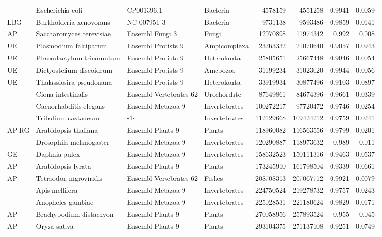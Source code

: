 \begin{table}[htbp]
{\begin{tabular}{ l l l l r r r r }
   & Escherichia coli & CP001396.1 & Bacteria & 4578159 & 4551258 & 0.9941 & 0.0059 \\
  LBG & Burkholderia xenovorans & NC 007951-3 & Bacteria & 9731138 & 9593486 & 0.9859 & 0.0141 \\
  AP & Saccharomyces cerevisiae & Ensembl Fungi 3 & Fungi & 12070898 & 11974342 & 0.992 & 0.008 \\
  UE & Plasmodium falciparum & Ensembl Protists 9 & Ampicomplexa & 23263332 & 21070640 & 0.9057 & 0.0943 \\
  UE & Phaeodactylum tricornutum & Ensembl Protists 9 & Heterokonta & 25805651 & 25667448 & 0.9946 & 0.0054 \\
  UE & Dictyostelium discoideum & Ensembl Protists 9 & Amebozoa & 31199234 & 31023020 & 0.9944 & 0.0056 \\
  UE & Thalassiosira pseudonana & Ensembl Protists 9 & Heterokonta & 33919934 & 30877496 & 0.9103 & 0.0897 \\
   & Ciona intestinalis & Ensembl Vertebrates 62 & Urochordate & 87649861 & 84674396 & 0.9661 & 0.0339 \\
   & Caenorhabditis elegans & Ensembl Metazoa 9 & Invertebrates & 100272217 & 97720472 & 0.9746 & 0.0254 \\
   & Tribolium castaneum & -1- & Invertebrates & 112129668 & 109424212 & 0.9759 & 0.0241 \\
  AP RG & Arabidopsis thaliana & Ensembl Plants 9 & Plants & 118960082 & 116563556 & 0.9799 & 0.0201 \\
   & Drosophila melanogaster & Ensembl Metazoa 9 & Invertebrates & 120290887 & 118973632 & 0.989 & 0.011 \\
  GE & Daphnia pulex & Ensembl Metazoa 9 & Invertebrates & 158632523 & 150111316 & 0.9463 & 0.0537 \\
  AP & Arabidopsis lyrata & Ensembl Plants 9 & Plants & 173245910 & 161798504 & 0.9339 & 0.0661 \\
  AP & Tetraodon nigroviridis & Ensembl Vertebrates 62 & Fishes & 208708313 & 207067712 & 0.9921 & 0.0079 \\
   & Apis mellifera & Ensembl Metazoa 9 & Invertebrates & 224750524 & 219278732 & 0.9757 & 0.0243 \\
   & Anopheles gambiae & Ensembl Metazoa 9 & Invertebrates & 225028531 & 221180624 & 0.9829 & 0.0171 \\
  AP & Brachypodium distachyon & Ensembl Plants 9 & Plants & 270058956 & 257893524 & 0.955 & 0.045 \\
  AP & Oryza sativa & Ensembl Plants 9 & Plants & 293104375 & 271137108 & 0.9251 & 0.0749 \\

\end{tabular}}
\end{table}
